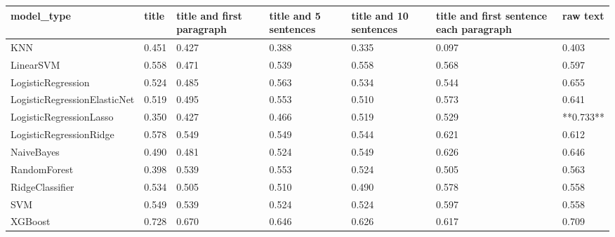 \begin{tabular}{lllllll}
\toprule
                  model\_type & title & title and first paragraph & title and 5 sentences & title and 10 sentences & title and first sentence each paragraph &  raw text \\
\midrule
                         KNN & 0.451 &                     0.427 &                 0.388 &                  0.335 &                                   0.097 &     0.403 \\
                   LinearSVM & 0.558 &                     0.471 &                 0.539 &                  0.558 &                                   0.568 &     0.597 \\
          LogisticRegression & 0.524 &                     0.485 &                 0.563 &                  0.534 &                                   0.544 &     0.655 \\
LogisticRegressionElasticNet & 0.519 &                     0.495 &                 0.553 &                  0.510 &                                   0.573 &     0.641 \\
     LogisticRegressionLasso & 0.350 &                     0.427 &                 0.466 &                  0.519 &                                   0.529 & **0.733** \\
     LogisticRegressionRidge & 0.578 &                     0.549 &                 0.549 &                  0.544 &                                   0.621 &     0.612 \\
                  NaiveBayes & 0.490 &                     0.481 &                 0.524 &                  0.549 &                                   0.626 &     0.646 \\
                RandomForest & 0.398 &                     0.539 &                 0.553 &                  0.524 &                                   0.505 &     0.563 \\
             RidgeClassifier & 0.534 &                     0.505 &                 0.510 &                  0.490 &                                   0.578 &     0.558 \\
                         SVM & 0.549 &                     0.539 &                 0.524 &                  0.524 &                                   0.597 &     0.558 \\
                     XGBoost & 0.728 &                     0.670 &                 0.646 &                  0.626 &                                   0.617 &     0.709 \\
\bottomrule
\end{tabular}
